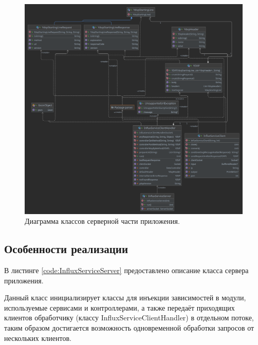 \begin{figure}[H]
	\centering
	\includegraphics[width=\textwidth]{img/serverDiagram.png}
	\caption{Диаграмма классов серверной части приложения. }
	\label{fig:serverAndProtocol}
\end{figure}

\subsection{Особенности реализации}
В листинге \ref{code:InfluxServiceServer} предоставлено описание класса сервера приложения.

Данный класс инициализирует классы для инъекции зависимостей в модули, используемые сервисами и контроллерами, а также передаёт приходящих клиентов обработчику (классу InfluxServiceClientHandler) в отдельном потоке, таким образом достигается возможность одновременной обработки запросов от нескольких клиентов.


